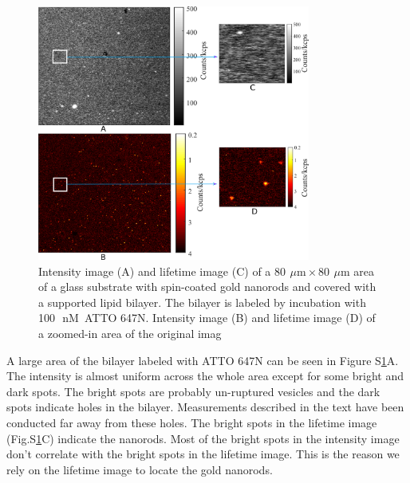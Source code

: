 \documentclass[11pt,a4paper,onecolumn]{article}
\newcommand{\um}{\ensuremath{\,\mu\textrm{m}}}
\newcommand{\nM}{\ensuremath{\,\textrm{nM}}}
\begin{document}
\begin{figure}[ht]
  \centering
  \includegraphics[width=0.8\textwidth]{xy_with_zoom.png}
  \makeatletter
  \renewcommand{\fnum@figure}{\figurename~S\thefigure}
  \makeatother{}
  \caption{ Intensity image (A) and lifetime image (C) of a $80~\um\times80~\um$ area of a glass substrate with 
  spin-coated gold nanorods and covered with a supported lipid bilayer. The bilayer is labeled by incubation with 
  100~\nM~ATTO 647N. Intensity image (B) and lifetime image (D) of a zoomed-in area of the original imag}
  \label{SIfig:xy-scan}
\end{figure}

A large area of the bilayer labeled with ATTO 647N can be seen in Figure S\ref{SIfig:xy-scan}A. The intensity is almost 
uniform across the whole area except for some bright and dark spots. The bright spots are probably un-ruptured vesicles 
and the dark spots indicate holes in the bilayer. Measurements described in the text have been conducted far away from 
these holes. The bright spots in the lifetime image (Fig.S\ref{SIfig:xy-scan}C) indicate the nanorods. Most of the 
bright spots in the intensity image don't correlate with the bright spots in the lifetime image. This is the reason we 
rely on the lifetime image to locate the gold nanorods.\\

\newpage
\end{document}
